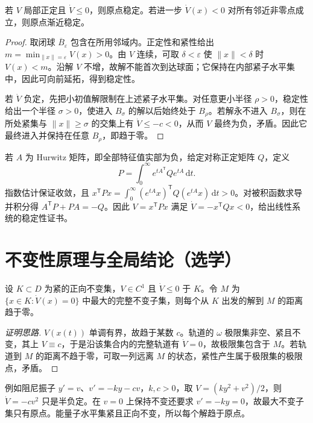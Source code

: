 \documentclass[UTF8,12pt,a4paper,fontset=fandol]{ctexbook}
\begin{document}
\begin{theorem}
若 $V$ 局部正定且 $\dot V\leq0$，则原点稳定。若进一步 $\dot V(x)<0$ 对所有邻近非零点成立，则原点渐近稳定。
\end{theorem}
\begin{proof}
取闭球 $\overline B_\varepsilon$ 包含在所用邻域内。正定性和紧性给出 $m=\min_{\|x\|=\varepsilon}V(x)>0$。由 $V$ 连续，可取 $\delta<\varepsilon$ 使 $\|x\|<\delta$ 时 $V(x)<m$。沿解 $V$ 不增，故解不能首次到达球面；它保持在内部紧子水平集中，因此可向前延拓，得到稳定性。

若 $\dot V$ 负定，先把小初值解限制在上述紧子水平集。对任意更小半径 $\rho>0$，稳定性给出一个半径 $\sigma>0$，使进入 $B_\sigma$ 的解以后始终处于 $B_\rho$。若解永不进入 $B_\sigma$，则在所处紧集与 $\|x\|\geq\sigma$ 的交集上有 $\dot V\leq-c<0$，从而 $V$ 最终为负，矛盾。因此它最终进入并保持在任意 $B_\rho$，即趋于零。
\end{proof}

\begin{example}[二次型的构造]
若 $A$ 为 Hurwitz 矩阵，即全部特征值实部为负，给定对称正定矩阵 $Q$，定义
\[
 P=\int_0^\infty e^{tA^{\mathsf T}}Qe^{tA}\,\mathrm dt.
\]
指数估计保证收敛，且 $x^{\mathsf T}Px=\int_0^\infty (e^{tA}x)^{\mathsf T}Q(e^{tA}x)\,\mathrm dt>0$。对被积函数求导并积分得 $A^{\mathsf T}P+PA=-Q$。因此 $V=x^{\mathsf T}Px$ 满足 $\dot V=-x^{\mathsf T}Qx<0$，给出线性系统的稳定性证书。
\end{example}

\section{不变性原理与全局结论（选学）}
\begin{theorem}
设 $K\subset D$ 为紧的正向不变集，$V\in C^1$ 且 $\dot V\leq0$ 于 $K$。令 $M$ 为 $\{x\in K:\dot V(x)=0\}$ 中最大的完整不变子集，则每个从 $K$ 出发的解到 $M$ 的距离趋于零。
\end{theorem}
\begin{proof}[证明思路]
$V(x(t))$ 单调有界，故趋于某数 $c$。轨道的 $\omega$ 极限集非空、紧且不变，其上 $V\equiv c$，于是沿该集合内的完整轨道有 $\dot V=0$，故极限集包含于 $M$。若轨道到 $M$ 的距离不趋于零，可取一列远离 $M$ 的状态，紧性产生属于极限集的极限点，矛盾。
\end{proof}

例如阻尼振子 $y'=v$、$v'=-ky-cv$，$k,c>0$，取 $V=(ky^2+v^2)/2$，则 $\dot V=-cv^2$ 只是半负定。在 $v=0$ 上保持不变还要求 $v'=-ky=0$，故最大不变子集只有原点。能量子水平集紧且正向不变，所以每个解趋于原点。
\end{document}
